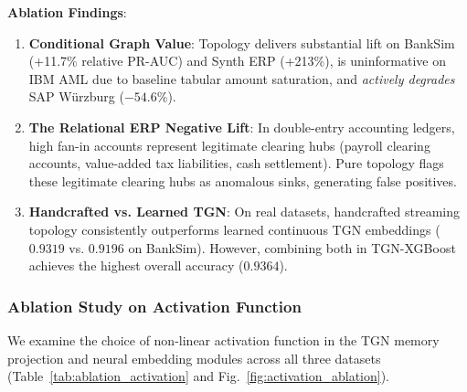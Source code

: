 \textbf{Ablation Findings}:
\begin{enumerate}
    \item \textbf{Conditional Graph Value}: Topology delivers substantial lift on BankSim (+11.7\% relative PR-AUC) and Synth ERP (+213\%), is uninformative on IBM AML due to baseline tabular amount saturation, and \emph{actively degrades} SAP W\"urzburg ($-54.6\%$).
    \item \textbf{The Relational ERP Negative Lift}: In double-entry accounting ledgers, high fan-in accounts represent legitimate clearing hubs (payroll clearing accounts, value-added tax liabilities, cash settlement). Pure topology flags these legitimate clearing hubs as anomalous sinks, generating false positives.
    \item \textbf{Handcrafted vs. Learned TGN}: On real datasets, handcrafted streaming topology consistently outperforms learned continuous TGN embeddings ($0.9319$ vs. $0.9196$ on BankSim). However, combining both in TGN-XGBoost achieves the highest overall accuracy ($0.9364$).
\end{enumerate}

\subsubsection{Ablation Study on Activation Function}\label{sec:ablation_activation}
We examine the choice of non-linear activation function in the TGN memory projection and neural embedding modules across all three datasets (Table~\ref{tab:ablation_activation} and Fig.~\ref{fig:activation_ablation}).

\begin{table}[t]
\centering
\caption{Ablation Study on Activation Function: Impact on Test PR-AUC and Optimization Stability.}
\label{tab:ablation_activation}
\end{table}

